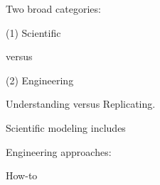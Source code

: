 

Two broad categories:

(1) Scientific

versus 

(2) Engineering 

Understanding versus Replicating.



Scientific modeling includes



Engineering approaches:

How-to